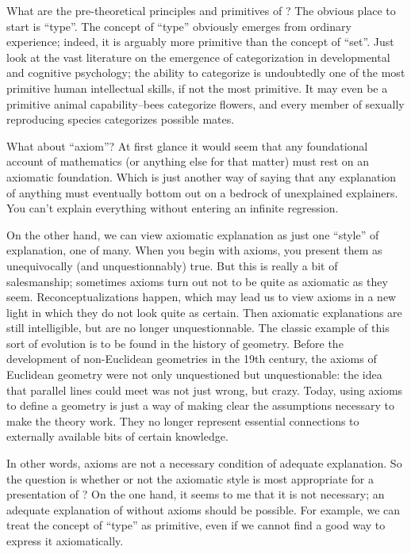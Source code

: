 What are the pre-theoretical principles and primitives of \HoTT?  The
obvious place to start is ``type''.  The concept of ``type'' obviously
emerges from ordinary experience; indeed, it is arguably more
primitive than the concept of ``set''.  Just look at the vast
literature on the emergence of categorization in developmental and
cognitive psychology; the ability to categorize is undoubtedly one of
the most primitive human intellectual skills, if not the most
primitive.  It may even be a primitive animal capability--bees
categorize flowers, and every member of sexually reproducing species
categorizes possible mates.

What about ``axiom''?  At first glance it would seem that any
foundational account of mathematics (or anything else for that matter)
must rest on an axiomatic foundation.  Which is just another way of
saying that any explanation of anything must eventually bottom out on
a bedrock of unexplained explainers.  You can't explain everything
without entering an infinite regression.

On the other hand, we can view axiomatic explanation as just one
``style'' of explanation, one of many.  When you begin with axioms,
you present them as unequivocally (and unquestionnably) true.  But
this is really a bit of salesmanship; sometimes axioms turn out not to
be quite as axiomatic as they seem.  Reconceptualizations happen,
which may lead us to view axioms in a new light in which they do not
look quite as certain.  Then axiomatic explanations are still
intelligible, but are no longer unquestionnable.  The classic example
of this sort of evolution is to be found in the history of geometry.
Before the development of non-Euclidean geometries in the 19th
century, the axioms of Euclidean geometry were not only unquestioned
but unquestionable: the idea that parallel lines could
meet was not just wrong, but crazy.  Today, using axioms to define a
geometry is just a way of making clear the assumptions necessary to
make the theory work.  They no longer represent essential
connections to externally available bits of certain knowledge.

In other words, axioms are not a necessary condition of adequate
explanation.  So the question is whether or not the axiomatic style is
most appropriate for a presentation of \HoTT?  On the one hand, it
seems to me that it is not necessary; an adequate explanation of \HoTT
without axioms should be possible.  For example, we can treat the
concept of ``type'' as primitive, even if we cannot find a good way to
express it axiomatically.

